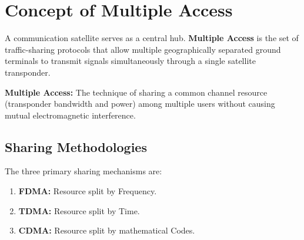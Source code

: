 \documentclass[12pt,a4paper]{article}
\begin{document}
\section{Concept of Multiple Access}

A communication satellite serves as a central hub. \textbf{Multiple Access} is the set of traffic-sharing protocols that allow multiple geographically separated ground terminals to transmit signals simultaneously through a single satellite transponder.

\begin{tcolorbox}[defbox]
\textbf{Multiple Access:} The technique of sharing a common channel resource (transponder bandwidth and power) among multiple users without causing mutual electromagnetic interference.
\end{tcolorbox}

\subsection{Sharing Methodologies}
The three primary sharing mechanisms are:
\begin{enumerate}[label=\textbf{\arabic*.}, leftmargin=*, itemsep=2.5pt]
  \item \textbf{FDMA:} Resource split by Frequency.
  \item \textbf{TDMA:} Resource split by Time.
  \item \textbf{CDMA:} Resource split by mathematical Codes.
\end{enumerate}
\end{document}
